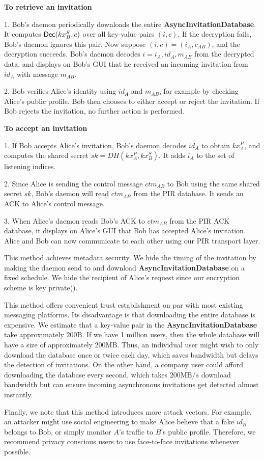 \textbf{To retrieve an invitation}

1. Bob's daemon periodically downloads the entire \textbf{AsyncInvitationDatabase}. It computes $\mathsf{Dec}(kx^S_B, c)$ over all key-value pairs $(i, c)$. If the decryption fails, Bob's daemon ignores this pair. Now suppose $(i, c) = (i_A, c_{AB})$, and the decryption succeeds. Bob's daemon decodes $i = i_A, id_A, m_{AB}$ from the decrypted data, and displays on Bob's GUI that he received an incoming invitation from $id_A$ with message $m_{AB}$.

2. Bob verifies Alice's identity using $id_A$ and $m_{AB}$, for example by checking Alice's public profile. Bob then chooses to either accept or reject the invitation. If Bob rejects the invitation, no further action is performed. 

\textbf{To accept an invitation}

1. If Bob accepts Alice's invitation, Bob's daemon decodes $id_A$ to obtain $kx_A^P$, and computes the shared secret $sk = DH(kx_A^P, kx_B^S)$. It adds $i_A$ to the set of listening indices.

2. Since Alice is sending the control message $ctm_{AB}$ to Bob using the same shared secret $sk$, Bob's daemon will read $ctm_{AB}$ from the PIR database. It sends an ACK to Alice's control message.

3. When Alice's daemon reads Bob's ACK to $ctm_{AB}$ from the PIR ACK database, it displays on Alice's GUI that Bob has accepted Alice's invitation. Alice and Bob can now communicate to each other using our PIR transport layer.

This method achieves metadata security. We hide the timing of the invitation by making the daemon send to and download \textbf{AsyncInvitationDatabase} on a fixed schedule. We hide the recipient of Alice's request since our encryption scheme is key private(). 

This method offers convenient trust establishment on par with most existing messaging platforms. Its disadvantage is that downloading the entire database is expensive. We estimate that a key-value pair in the \textbf{AsyncInvitationDatabase} take approximately $200\text{B}$. If we have 1 million users, then the whole database will have a size of approximately $200\text{MB}$. Thus, an individual user might wish to only download the database once or twice each day, which saves bandwidth but delays the detection of invitations. On the other hand, a company user could afford downloading the database every second, which takes $200\text{MB}/s$ download bandwidth but can ensure incoming asynchronous invitations get detected almost instantly.

Finally, we note that this method introduces more attack vectors. For example, an attacker might use social engineering to make Alice believe that a fake $id_B$ belongs to Bob, or simply monitor $A$'s traffic to $B$'s public profile. Therefore, we recommend privacy conscious users to use face-to-face invitations whenever possible.